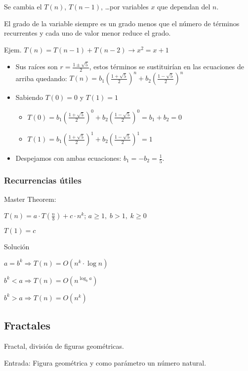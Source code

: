 Se cambia el $T(n)$, $T(n-1)$, \ldots por variables $x$ que dependan del $n$.

El grado de la variable siempre es un grado menos que el número de términos recurrentes y cada uno de valor menor reduce el grado.

Ejem. $T(n)=T(n-1)+T(n-2) \rightarrow x^2= x + 1$
\begin{itemize}
	\item Sus raíces son $r = \frac{1\pm \sqrt{5}}{2}$, estos términos se sustituirían en las ecuaciones de arriba quedando: $T\left(n\right)= b_1\left(\frac{1+ \sqrt{5}}{2}\right)^n + b_2\left(\frac{1- \sqrt{5}}{2}\right)^n$
	\item Sabiendo $T\left(0\right) = 0$ y $T\left(1\right)=1$
	      \begin{itemize}
		      \item $T\left(0\right)= b_1\left(\frac{1+ \sqrt{5}}{2}\right)^0 + b_2\left(\frac{1- \sqrt{5}}{2}\right)^0 = b_1 + b_2 = 0$
		      \item $T\left(1\right)= b_1\left(\frac{1+ \sqrt{5}}{2}\right)^1 + b_2\left(\frac{1- \sqrt{5}}{2}\right)^1 = 1$
	      \end{itemize}
	\item Despejamos con ambas ecuaciones: $b_1 = -b_2 = \frac{1}{5}$.
\end{itemize}

\subsubsection{Recurrencias útiles}
Master Theorem:

$T\left(n\right) = a \cdot T\left(\frac{n}{b}\right) + c \cdot n^k$; $a \geq 1,\; b > 1,\; k \geq 0$

$T\left(1\right)=c$

Solución

$a = b^k \Rightarrow T\left(n\right) = O\left(n^{k} \cdot \log n\right)$

$b^k < a \Rightarrow T\left(n\right) = O\left(n^{\log_b a}\right)$

$b^k > a \Rightarrow T\left(n\right) = O\left(n^{k}\right)$

\subsection{Fractales}
Fractal, división de figuras geométricas.

Entrada: Figura geométrica y como parámetro un número natural.

